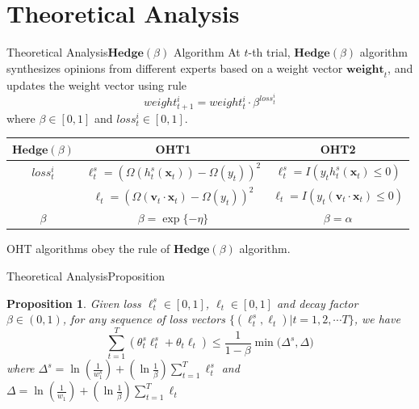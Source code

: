 \documentclass{beamer}
\newtheorem{prop}{Proposition}
\begin{document}
\section{Theoretical Analysis}
\begin{frame}{Theoretical Analysis}{$\mathbf{Hedge}(\beta)$ Algorithm}
At $t$-th trial, $\mathbf{Hedge}(\beta)$ algorithm synthesizes opinions from different experts based on a weight vector $\mathbf{weight}_t$, and updates the weight vector using rule
$$ weight_{t+1}^{i} = weight_{t}^{i} \cdot \beta^{loss_{t}^{i}} $$
where $\beta \in [0,1]$ and $loss_{t}^{i} \in [0,1]$.
\begin{small}
\begin{table}
\begin{tabular}{c|c|c}
\hline
\multicolumn{1}{c|}{$\mathbf{Hedge}(\beta)$} &
\multicolumn{1}{c|}{OHT1} &
\multicolumn{1}{c}{OHT2} \\
\hline
$loss_{t}^{i}$ & $\ell_{t}^{s} = (\varOmega(h_{t}^{s}(\mathbf{x}_t)) - \varOmega(y_t)) ^ 2$ & $\ell_{t}^{s} = I(y_t h_{t}^{s}(\mathbf{x}_t) \leq 0)$ \\
               & $\ell_t = (\varOmega(\mathbf{v}_t \cdot \mathbf{x}_t) - \varOmega(y_t)) ^ 2$ & $\ell_{t} = I(y_t (\mathbf{v}_t \cdot \mathbf{x}_t) \leq 0)$ \\
\hline
$\beta$        & $\beta = \exp\{-\eta\}$ & $\beta = \alpha$ \\
\hline
\end{tabular}
\end{table}
\end{small}
OHT algorithms obey the rule of $\mathbf{Hedge}(\beta)$ algorithm.
\end{frame}

\begin{frame}{Theoretical Analysis}{Proposition}
\begin{small}
\begin{prop}
Given loss $\ell_{t}^{s} \in [0,1]$, $\ell_t \in [0,1]$ and decay factor $\beta \in (0,1)$, for any sequence of loss vectors $\{ (\ell_{t}^{s}, \ell_{t}) | t = 1, 2, \cdots T \} $, we have
$$ \sum\limits_{t=1}^{T} ( \theta_{t}^{s} \ell_{t}^{s} + \theta_t \ell_t ) \leq \frac{1}{1-\beta} \min \big( \varDelta^s, \varDelta \big) $$
where
$ \varDelta^s = \ln(\frac{1}{w_{1}^{s}}) + (\ln \frac{1}{\beta}) \sum\limits_{t=1}^{T} \ell_{t}^{s} $ and $ \varDelta = \ln(\frac{1}{w_{1}}) + (\ln \frac{1}{\beta}) \sum\limits_{t=1}^{T} \ell_{t} $
\end{prop}
\end{small}
\end{frame}
\end{document}
